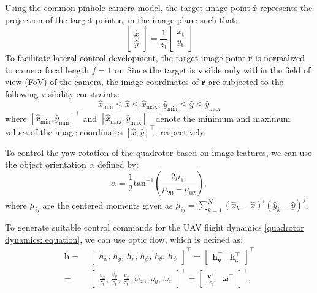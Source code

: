 \documentclass[lettersize,journal]{IEEEtran}
\begin{document}
Using the common pinhole camera model, the target image point $\boldsymbol{\hat{r}}$ represents the projection of the target point $\boldsymbol{r}_{\text{t}}$ in the image plane such that:
\begin{equation} \label{Eq. (2)}
    \begin{bmatrix} \hat{x} \\ \hat{y}\end{bmatrix}
    = \frac{1}{z_{\text{t}}} \begin{bmatrix} x_{\text{t}} \\ y_{\text{t}}\end{bmatrix}
\end{equation}
To facilitate lateral control development, the target image point $\boldsymbol{\hat{r}}$ is normalized to camera focal length $f = 1$ m. 
Since the target is visible only within the field of view (FoV) of the camera, the image coordinates of $\boldsymbol{\hat{r}}$ are subjected to the following visibility constraints:
\begin{equation} \label{Eq. (3)}
    \hat{x}_{\text{min}} \leq \hat{x} \leq \hat{x}_{\text{max}},\,
    \hat{y}_{\text{min}} \leq \hat{y} \leq \hat{y}_{\text{max}}
\end{equation}
 where $[\hat{x}_{\text{min}}, \hat{y}_{\text{min}}]^{\top}$ and $[\hat{x}_{\text{max}}, \hat{y}_{\text{max}}]^{\top}$ denote the minimum and maximum values of the image coordinates $[\hat{x}, \hat{y}]^{\top}$, respectively.

To control the yaw rotation of the quadrotor based on image features, we can use the object orientation $\alpha$ defined by:
\begin{equation} \label{Eq. (4)}
    \alpha = \frac{1}{2} \text{tan}^{-1}\left( \frac{2 \mu_{11}}{\mu_{20} - \mu_{02}}\right),
\end{equation}
where $\mu_{ij}$ are the centered moments given as $\mu_{ij} = \sum^{N}_{k=1} (\hat{x}_k - \hat{x})^i (\hat{y}_k - \hat{y})^j$.

To generate suitable control commands for the UAV flight dynamics \eqref{quadrotor dynamics: equation}, we can use optic flow, which is defined as:
\begin{align} \label{optic flow: equation}
    \boldsymbol{h} =& ~ \begin{bmatrix}
        h_x,\, h_y,\, h_r,\, h_{\phi}, \, h_{\theta}, \, h_{\psi}
    \end{bmatrix}^{\top} = \begin{bmatrix} 
        \boldsymbol{h}_{\boldsymbol{v}}^{\top} & \boldsymbol{h}_{\boldsymbol{\omega}}^{\top}
    \end{bmatrix}^{\top} \nonumber \\
    =& ~ \begin{bmatrix}
        \frac{v_x}{z_{\text{t}}},\, \frac{v_y}{z_{\text{t}}},\, \frac{v_z}{z_{\text{t}}},\, \omega_{x}, \, \omega_{y}, \, \omega_{z}
    \end{bmatrix}^{\top} = \begin{bmatrix} 
        \frac{\boldsymbol{v}^{\top}}{z_{\text{t}}} & \boldsymbol{\omega}^{\top}
    \end{bmatrix}^{\top},
\end{align}
\end{document}

